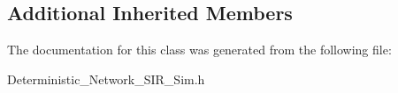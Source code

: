 \subsection*{Additional Inherited Members}


The documentation for this class was generated from the following file\+:\begin{DoxyCompactItemize}
\item 
Deterministic\+\_\+\+Network\+\_\+\+S\+I\+R\+\_\+\+Sim.\+h\end{DoxyCompactItemize}
